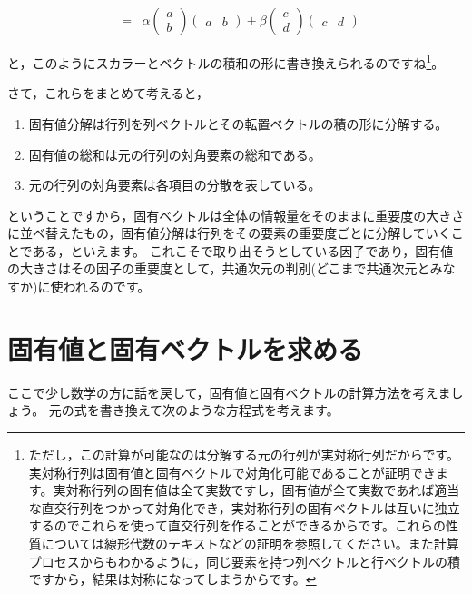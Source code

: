 \documentclass{ltjsbook}
\begin{document}
\[\begin{array}{lll}
		              &                                                                                                                                            \\
		              & = & \alpha \begin{pmatrix}a\\b\end{pmatrix}\begin{pmatrix}a &b\end{pmatrix} +
		\beta \begin{pmatrix} c\\d \end{pmatrix}\begin{pmatrix}c&d\end{pmatrix}
	\end{array}
\]

と，このようにスカラーとベクトルの積和の形に書き換えられるのですね\footnote{ただし，この計算が可能なのは分解する元の行列が実対称行列だからです。実対称行列は固有値と固有ベクトルで対角化可能であることが証明できます。実対称行列の固有値は全て実数ですし，固有値が全て実数であれば適当な直交行列をつかって対角化でき，実対称行列の固有ベクトルは互いに独立するのでこれらを使って直交行列を作ることができるからです。これらの性質については線形代数のテキストなどの証明を参照してください。また計算プロセスからもわかるように，同じ要素を持つ列ベクトルと行ベクトルの積ですから，結果は対称になってしまうからです。}。

さて，これらをまとめて考えると，
\begin{enumerate}
	\item 固有値分解は行列を列ベクトルとその転置ベクトルの積の形に分解する。
	\item 固有値の総和は元の行列の対角要素の総和である。
	\item 元の行列の対角要素は各項目の分散を表している。
\end{enumerate}
ということですから，固有ベクトルは全体の情報量をそのままに重要度の大きさに並べ替えたもの，固有値分解は行列をその要素の重要度ごとに分解していくことである，といえます。
これこそで取り出そうとしている因子であり，固有値の大きさはその因子の重要度として，共通次元の判別(どこまで共通次元とみなすか)に使われるのです。

\section{固有値と固有ベクトルを求める}
ここで少し数学の方に話を戻して，固有値と固有ベクトルの計算方法を考えましょう。
元の式を書き換えて次のような方程式を考えます。
\end{document}
